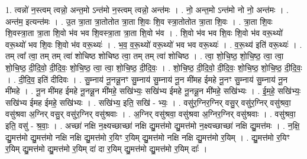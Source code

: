 \documentclass[17pt]{extarticle}
\begin{document}
1. त्वन्नो॑ न॒स्त्वम् त्वन्नो॒ अन्त॒मो ऽन्त॑मो न॒स्त्वम् त्वन्नो॒ अन्त॑मः । . नो॒ अन्त॒मो ऽन्त॑मो नो नो॒ अन्त॑मः । . अन्त॑म॒ इत्यन्त॑मः । . उ॒त त्रा॒ता त्रा॒तोतोत त्रा॒ता शि॒वः शि॒व स्त्रा॒तोतोत त्रा॒ता शि॒वः । . त्रा॒ता शि॒वः शि॒वस्त्रा॒ता त्रा॒ता शि॒वो भ॑व भव शि॒वस्त्रा॒ता त्रा॒ता शि॒वो भ॑व । . शि॒वो भ॑व भव शि॒वः शि॒वो भ॑व वरू॒थ्यो॑ वरू॒थ्यो॑ भव शि॒वः शि॒वो भ॑व वरू॒थ्यः॑ । . भ॒व॒ व॒रू॒थ्यो॑ वरू॒थ्यो॑ भव भव वरू॒थ्यः॑ । . व॒रू॒थ्य॑ इति॑ वरू॒थ्यः॑ । . तम् त्वा᳚ त्वा॒ तम् तम् त्वा॑ शोचिष्ठ शोचिष्ठ त्वा॒ तम् तम् त्वा॑ शोचिष्ठ । . त्वा॒ शो॒चि॒ष्ठ॒ शो॒चि॒ष्ठ॒ त्वा॒ त्वा॒ शो॒चि॒ष्ठ॒ दी॒दि॒वो॒ दी॒दि॒वः॒ शो॒चि॒ष्ठ॒ त्वा॒ त्वा॒ शो॒चि॒ष्ठ॒ दी॒दि॒वः॒ । . शो॒चि॒ष्ठ॒ दी॒दि॒वो॒ दी॒दि॒वः॒ शो॒चि॒ष्ठ॒ शो॒चि॒ष्ठ॒ दी॒दि॒वः॒ । . दी॒दि॒व॒ इति॑ दीदिवः । . सु॒म्नाय॑ नू॒नन्नू॒नꣳ सु॒म्नाय॑ सु॒म्नाय॑ नू॒न मी॑मह ईमहे नू॒नꣳ सु॒म्नाय॑ सु॒म्नाय॑ नू॒न मी॑महे । . नू॒न मी॑मह ईमहे नू॒नन्नू॒न मी॑महे॒ सखि॑भ्यः॒ सखि॑भ्य ईमहे नू॒नन्नू॒न मी॑महे॒ सखि॑भ्यः । . ई॒म॒हे॒ सखि॑भ्यः॒ सखि॑भ्य ईमह ईमहे॒ सखि॑भ्यः । . सखि॑भ्य॒ इति॒ सखि॑ - भ्यः॒ । . वसु॑र॒ग्निर॒ग्निर् वसु॒र् वसु॑र॒ग्निर् वसु॑श्रवा॒ वसु॑श्रवा अ॒ग्निर् वसु॒र् वसु॑र॒ग्निर् वसु॑श्रवाः । . अ॒ग्निर् वसु॑श्रवा॒ वसु॑श्रवा अ॒ग्निर॒ग्निर् वसु॑श्रवाः । . वसु॑श्रवा॒ इति॒ वसु॑ - श्र॒वाः॒ । . अच्छा॑ नक्षि न॒क्ष्यच्छाच्छा॑ नक्षि द्यु॒मत्त॑मो द्यु॒मत्त॑मो न॒क्ष्यच्छाच्छा॑ नक्षि द्यु॒मत्त॑मः । . न॒क्षि॒ द्यु॒मत्त॑मो द्यु॒मत्त॑मो नक्षि नक्षि द्यु॒मत्त॑मो र॒यिꣳ र॒यिम् द्यु॒मत्त॑मो नक्षि नक्षि द्यु॒मत्त॑मो र॒यिम् । . द्यु॒मत्त॑मो र॒यिꣳ र॒यिम् द्यु॒मत्त॑मो द्यु॒मत्त॑मो र॒यिम् दा॑ दा र॒यिम् द्यु॒मत्त॑मो द्यु॒मत्त॑मो र॒यिम् दाः᳚ । \newline
\end{document}
